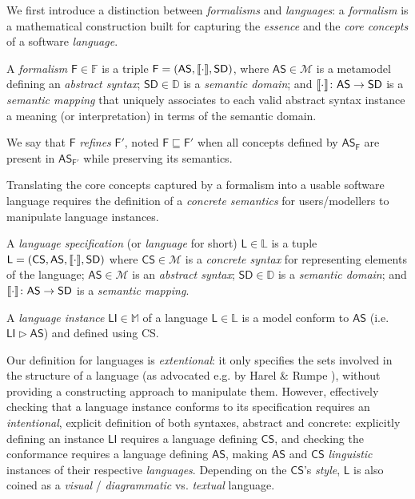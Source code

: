 We first introduce a distinction between \emph{formalisms} and \emph{languages}: 
a \emph{formalism} is a mathematical construction built for capturing the 
\emph{essence} and the \emph{core concepts} of a software \emph{language}. 

\begin{Definition}
   A \emph{formalism} $\mathsf{F}\in\mathbb{F}$ is a triple $\mathsf{F} = 
(\mathsf{AS}, 
\llbracket \cdot \rrbracket, \mathsf{SD})$, where $\mathsf{AS}\in\mathcal{M}$ is a metamodel 
defining an \emph{abstract syntax}; $\mathsf{SD}\in\mathbb{D}$ is a 
\emph{semantic domain}; and $\llbracket \cdot \rrbracket 
\colon \mathsf{AS} \to \mathsf{SD}$ is a \emph{semantic mapping} that uniquely 
associates to each valid abstract syntax instance a meaning (or interpretation) 
in terms of the semantic domain.
   
   We say that $\mathsf{F}$ \emph{refines} $\mathsf{F'}$, noted $\mathsf{F} 
\sqsubseteq \mathsf{F'}$ when all concepts defined by 
$\mathsf{AS}_{\mathsf{F}}$ are present in $\mathsf{AS}_{\mathsf{F'}}$ while 
preserving its semantics.
\end{Definition}

Translating the core concepts captured by a formalism into a usable software 
language requires the definition of a \emph{concrete semantics} for 
users/modellers to manipulate language instances.


 \begin{Definition}
   A \emph{language specification} (or \emph{language} 
for short) $\mathsf{L}\in\mathbb{L}$ is a tuple $\mathsf{L} = (\mathsf{CS}, 
\mathsf{AS}, \llbracket \cdot \rrbracket, \mathsf{SD})$ where $\mathsf{CS}\in\mathcal{M}$ is a 
\emph{concrete syntax} for representing elements of the language;  
$\mathsf{AS}\in\mathcal{M}$ is an \emph{abstract syntax}; 
$\mathsf{SD}\in\mathbb{D}$ is 
a \emph{semantic domain}; and $\llbracket \cdot \rrbracket \colon \mathsf{AS} \to \mathsf{SD}$ is 
a \emph{semantic mapping}. 

   A \emph{language instance} $\mathsf{LI}\in\mathbb{M}$ of a language 
$\mathsf{L}\in\mathbb{L}$ is a model conform to $\mathsf{AS}$ (i.e. 
$\mathsf{LI} \rhd \mathsf{AS}$) and defined using \textsf{CS}.
\end{Definition}

\smallskip\noindent
Our definition for languages is \emph{extentional}: it only specifies the sets 
involved in the structure of a language (as advocated e.g. by Harel \& Rumpe 
\cite{J:Harel-Rumpe:2004}), without providing a constructing approach to 
manipulate them. However, effectively checking that a language instance 
conforms to its specification requires an \emph{intentional}, explicit 
definition of both syntaxes, abstract and concrete: explicitly defining an 
instance $\mathsf{LI}$ requires a language defining $\mathsf{CS}$, and checking 
the conformance requires a language defining $\mathsf{AS}$, making 
$\mathsf{AS}$ and $\mathsf{CS}$ \emph{linguistic} instances of their respective 
\emph{languages}. Depending on the $\mathsf{CS}$'s \emph{style}, $\mathsf{L}$ 
is also coined as a \emph{visual} / \emph{diagrammatic} vs. \emph{textual} 
language.

